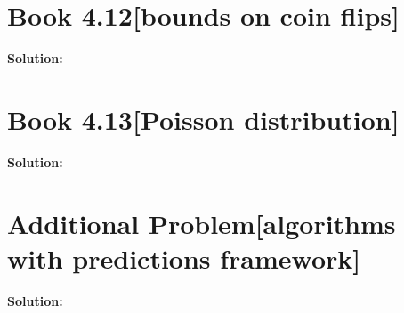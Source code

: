 \documentclass[11pt]{article}
\newenvironment{question}[2]
{\newpage\section{#1\texorpdfstring{\hfill}{horizontal spacing}{\rm\normalsize #2}}}{}
\newenvironment{solution}
{\textbf{Solution: }\color{blue}}
{\color{black}}
\begin{document}

\begin{question}{Book 4.12}{[bounds on coin flips]}


\begin{solution}

\end{solution}
\end{question}


\begin{question}{Book 4.13}{[Poisson distribution]}


\begin{solution}

\end{solution}
\end{question}


\begin{question}{Additional Problem}{[algorithms with predictions framework]}

\begin{solution}

\end{solution}
\end{question}
\end{document}

